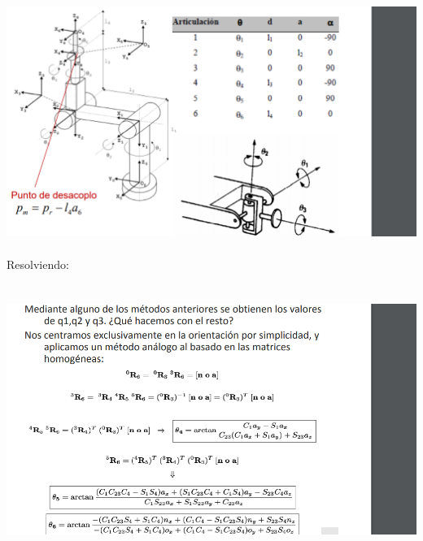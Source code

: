 \documentclass[12pt,a4paper]{article}
\begin{document}
\includegraphics[scale=0.6]{imagen4.png} 
\\\\
Resolviendo:
\\\\\\
\includegraphics[scale=0.6]{imagen5.png} 
\end{document}
